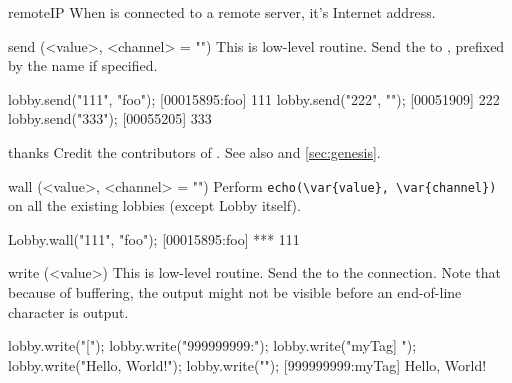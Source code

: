 \begin{urbiscriptapi}
\item[remoteIP]
  When \this is connected to a remote server, it's Internet address.


\item[send](<value>, <channel> = "")%
  This is low-level routine.  Send the  
  to \this, prefixed by the 
   name if specified.
\begin{urbiscript}
lobby.send("111", "foo");
[00015895:foo] 111
lobby.send("222", "");
[00051909] 222
lobby.send("333");
[00055205] 333
\end{urbiscript}


\item[thanks] Credit the contributors of \usdk.  See also 
  and \autoref{sec:genesis}.

\item[wall](<value>, <channel> = "")%
  Perform \lstinline|echo(\var{value}, \var{channel})| on all the
  existing lobbies (except Lobby itself).
\begin{urbiscript}[firstnumber=1]
Lobby.wall("111", "foo");
[00015895:foo] *** 111
\end{urbiscript}


\item[write](<value>)%
  This is low-level routine.  Send the  
  to the connection.  Note that because of buffering, the output might
  not be visible before an end-of-line character is output.
\begin{urbiunchecked}
lobby.write("[");
lobby.write("999999999:");
lobby.write("myTag] ");
lobby.write("Hello, World!");
lobby.write("\n");
[999999999:myTag] Hello, World!
\end{urbiunchecked}
\end{urbiscriptapi}

